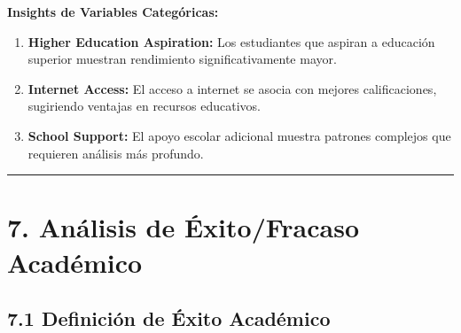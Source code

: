 \documentclass[
]{book}
\begin{document}
\textbf{Insights de Variables Categóricas:}

\begin{enumerate}
\def\labelenumi{\arabic{enumi}.}
\item
  \textbf{Higher Education Aspiration:} Los estudiantes que aspiran a educación superior muestran rendimiento significativamente mayor.
\item
  \textbf{Internet Access:} El acceso a internet se asocia con mejores calificaciones, sugiriendo ventajas en recursos educativos.
\item
  \textbf{School Support:} El apoyo escolar adicional muestra patrones complejos que requieren análisis más profundo.
\end{enumerate}

\begin{center}\rule{0.5\linewidth}{0.5pt}\end{center}

\section{7. Análisis de Éxito/Fracaso Académico}\label{anuxe1lisis-de-uxe9xitofracaso-acaduxe9mico}

\subsection{7.1 Definición de Éxito Académico}\label{definiciuxf3n-de-uxe9xito-acaduxe9mico}
\end{document}
